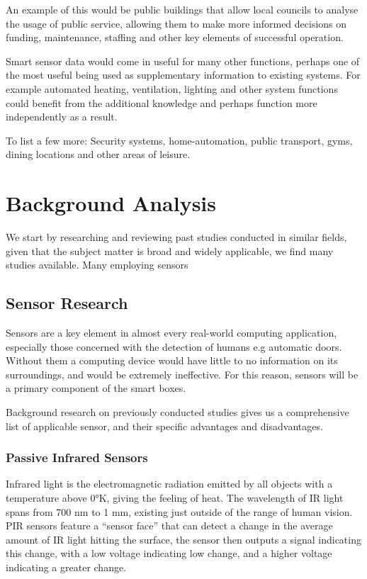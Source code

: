 \documentclass{l4proj}
\begin{document}
An example of this would be public buildings that allow local councils to analyse the usage of public service, allowing them to make more informed decisions on funding, maintenance, staffing and other key elements of successful operation.

Smart sensor data would come in useful for many other functions, perhaps one of the most useful being used as supplementary information to existing systems. For example automated heating, ventilation, lighting and other system functions could benefit from the additional knowledge and perhaps function more independently as a result.

To list a few more: Security systems, home-automation, public transport, gyms, dining locations and other areas of leisure.



\chapter{Background Analysis}
We start by researching and reviewing past studies conducted in similar fields, given that the subject matter is broad and widely applicable, we find many studies available. Many employing sensors 


\section{Sensor Research}
Sensors are a key element in almost every real-world computing application, especially those concerned with the detection of humans e.g automatic doors. Without them a computing device would have little to no information on its surroundings, and would be extremely ineffective. For this reason, sensors will be a primary component of the smart boxes.

Background research on previously conducted studies gives us a comprehensive list of applicable sensor, and their specific advantages and disadvantages.

\subsection{Passive Infrared Sensors}
Infrared light is the electromagnetic radiation emitted by all objects with a temperature above 0°K, giving the feeling of heat. The wavelength of IR light spans from 700 nm to 1 mm, existing just outside of the range of human vision. PIR sensors feature a “sensor face” that can detect a change in the average amount of IR light hitting the surface, the sensor then outputs a signal indicating this change, with a low voltage indicating low change, and a higher voltage indicating a greater change.
\end{document}
